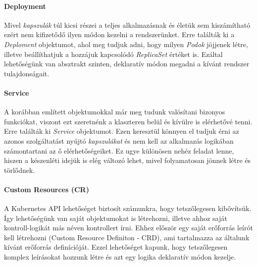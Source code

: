 \paragraph{Deployment}
Mivel \textit{kapszulák} túl kicsi részei a teljes alkalmazásnak és életük sem kiszámítható ezért nem kifizetődő ilyen módon kezelni a rendszerünket.
Erre találták ki a \textit{Deploment} objektumot, ahol meg tudjuk adni, hogy milyen \textit{Podok} jöjjenek létre, illetve beállíthatjuk a hozzájuk kapcsolódó \textit{ReplicaSet} értéket is. 
Ezáltal lehetőségünk van absztrakt szinten, deklaratív módon megadni a kívánt rendszer tulajdonságait.

\paragraph{Service}
A korábban említett objektumokkal már meg tudunk valósítani bizonyos funkciókat, viszont ezt szeretnénk a klaszteren belül és kívülre is elérhetővé tenni.
Erre találták ki \textit{Service} objektumot. 
Ezen keresztül könnyen el tudjuk érni az azonos szolgáltatást nyújtó \textit{kapszulákat} és nem kell az alkalmazás logikában számontartani az ő elérhetőségeiket.
Ez ugye különösen nehéz feladat lenne, hiszen a készenléti idejük is elég változó lehet, mivel folyamatosan jönnek létre és törlődnek.

\paragraph{Custom Resources (CR)}
A Kubernetes API lehetőséget biztosít számunkra, hogy tetszőlegesen kibővítsük. 
Így lehetőségünk van saját objektumokat is létrehozni, illetve ahhoz saját kontroll-logikát más néven kontrollert írni.
Ehhez először egy saját erőforrás leírót kell létrehozni (Custom Resource Definiton - CRD), ami tartalmazza az általunk kívánt erőforrás definícióját.
Ezzel lehetőséget kapunk, hogy tetszőlegesen komplex leírásokat hozzunk létre és azt egy logika deklaratív módon kezelje.


